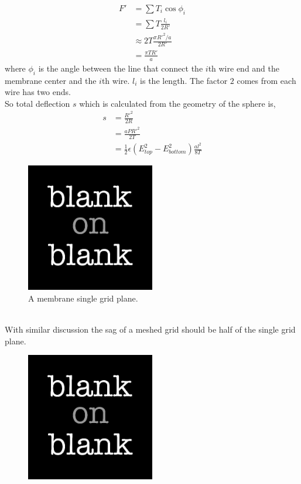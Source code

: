 \begin{align}
F' & = \sum T_i \cos \phi_i \\
& = \sum T \frac{l_i}{2 R'}\\
& \approx 2 T \frac{\pi R'^2/a}{2 R'} \\
& = \frac{\pi T R'}{a}
\end{align}
where $\phi_i$ is the angle between the line that connect the $i$th wire end and the membrane center and the $i$th wire. $l_i$ is the length. The factor $2$ comes from each wire has two ends.
\\
So total deflection $s$ which is calculated from the geometry of the sphere is,
\begin{align}
s & = \frac{R'^2}{2 R} \\
& = \frac{a P R'^2}{2 T} \\
& = \frac{1}{2}\epsilon (E_{top}^2 - E_{bottom}^2) \frac{a l^2}{8 T}
\end{align}
\begin{figure}[h!]
  \centering
  \includegraphics[width=0.5\textwidth]
  {blank.jpg}
  \caption{A membrane single grid plane.}
  \label{fig: membrane grid plane}
\end{figure}
\\
With similar discussion the sag of a meshed grid should be half of the single grid plane.

























\begin{figure}[h!]
  \centering
  \includegraphics[width=0.5\textwidth]
  {blank.jpg}
  \caption{}
  \label{fig:}
\end{figure}






